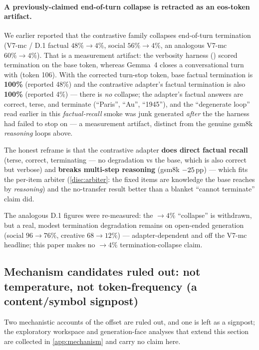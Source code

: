 \paragraph{A previously-claimed end-of-turn collapse is retracted as an eos-token
artifact.}
We earlier reported that the contrastive family collapses end-of-turn termination
(V7-mc / D.1 factual $48\%{\rightarrow}4\%$, social $56\%{\rightarrow}4\%$, an
analogous V7-mc $60\%{\rightarrow}4\%$). That is a measurement artifact: the
verbosity harness () scored termination on the base
 token, whereas Gemma~4 closes a conversational turn with
 (token 106). With the corrected turn-stop token, base
factual termination is \textbf{100\%} (reported 48\%) and the contrastive adapter's
factual termination is also \textbf{100\%} (reported 4\%) --- there is \emph{no}
collapse; the adapter's factual answers are correct, terse, and terminate
(``Paris'', ``Au'', ``1945''), and the ``degenerate loop'' read earlier in this
\emph{factual-recall} smoke was junk generated \emph{after} the
 the harness had failed to stop on --- a measurement
artifact, distinct from the genuine gsm8k \emph{reasoning} loops above.

The honest reframe is that the contrastive adapter \textbf{does direct factual
recall} (terse, correct, terminating --- no degradation vs the base, which is also
correct but verbose) and \textbf{breaks multi-step reasoning} (gsm8k $-25\,\mathrm{pp}$) ---
which fits the per-item arbiter (\cref{disc:arbiter}: the fixed items are knowledge
the base reaches by \emph{reasoning}) and the no-transfer result better than a
blanket ``cannot terminate'' claim did.

The analogous D.1 figures were re-measured: the ${\rightarrow}4\%$ ``collapse'' is
withdrawn, but a real, modest termination degradation remains on open-ended
generation (social $96{\rightarrow}76\%$, creative $68{\rightarrow}12\%$) ---
adapter-dependent and off the V7-mc headline; this paper makes no
${\rightarrow}4\%$ termination-collapse claim.

\subsection{Mechanism candidates ruled out: not temperature, not token-frequency
(a content/symbol signpost)}\label{disc:negatives}

Two mechanistic accounts of the offset are ruled out, and one is left as a
signpost; the exploratory workspace and generation-face analyses that extend this
section are collected in \cref{app:mechanism} and carry no claim here.

